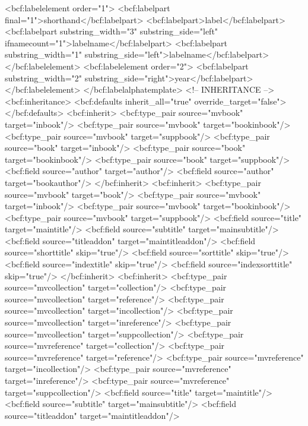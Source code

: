     <bcf:labelelement order="1">
      <bcf:labelpart final="1">shorthand</bcf:labelpart>
      <bcf:labelpart>label</bcf:labelpart>
      <bcf:labelpart substring_width="3" substring_side="left" ifnamecount="1">labelname</bcf:labelpart>
      <bcf:labelpart substring_width="1" substring_side="left">labelname</bcf:labelpart>
    </bcf:labelelement>
    <bcf:labelelement order="2">
      <bcf:labelpart substring_width="2" substring_side="right">year</bcf:labelpart>
    </bcf:labelelement>
  </bcf:labelalphatemplate>
  <!-- INHERITANCE -->
  <bcf:inheritance>
    <bcf:defaults inherit_all="true" override_target="false">
    </bcf:defaults>
    <bcf:inherit>
      <bcf:type_pair source="mvbook" target="inbook"/>
      <bcf:type_pair source="mvbook" target="bookinbook"/>
      <bcf:type_pair source="mvbook" target="suppbook"/>
      <bcf:type_pair source="book" target="inbook"/>
      <bcf:type_pair source="book" target="bookinbook"/>
      <bcf:type_pair source="book" target="suppbook"/>
      <bcf:field source="author" target="author"/>
      <bcf:field source="author" target="bookauthor"/>
    </bcf:inherit>
    <bcf:inherit>
      <bcf:type_pair source="mvbook" target="book"/>
      <bcf:type_pair source="mvbook" target="inbook"/>
      <bcf:type_pair source="mvbook" target="bookinbook"/>
      <bcf:type_pair source="mvbook" target="suppbook"/>
      <bcf:field source="title" target="maintitle"/>
      <bcf:field source="subtitle" target="mainsubtitle"/>
      <bcf:field source="titleaddon" target="maintitleaddon"/>
      <bcf:field source="shorttitle" skip="true"/>
      <bcf:field source="sorttitle" skip="true"/>
      <bcf:field source="indextitle" skip="true"/>
      <bcf:field source="indexsorttitle" skip="true"/>
    </bcf:inherit>
    <bcf:inherit>
      <bcf:type_pair source="mvcollection" target="collection"/>
      <bcf:type_pair source="mvcollection" target="reference"/>
      <bcf:type_pair source="mvcollection" target="incollection"/>
      <bcf:type_pair source="mvcollection" target="inreference"/>
      <bcf:type_pair source="mvcollection" target="suppcollection"/>
      <bcf:type_pair source="mvreference" target="collection"/>
      <bcf:type_pair source="mvreference" target="reference"/>
      <bcf:type_pair source="mvreference" target="incollection"/>
      <bcf:type_pair source="mvreference" target="inreference"/>
      <bcf:type_pair source="mvreference" target="suppcollection"/>
      <bcf:field source="title" target="maintitle"/>
      <bcf:field source="subtitle" target="mainsubtitle"/>
      <bcf:field source="titleaddon" target="maintitleaddon"/>
